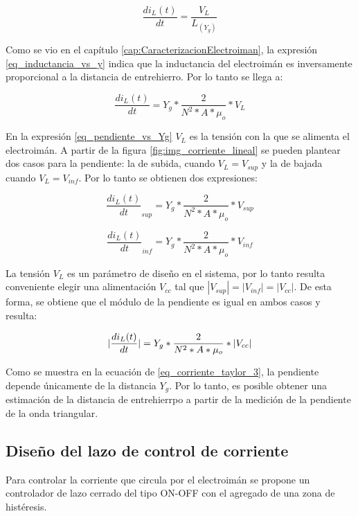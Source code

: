\begin{equation} 
	\frac{di_L(t)}{dt}= \frac{V_L}{L_{(Y_g)}}
\end{equation}


Como se vio en el capítulo \ref{cap:CaracterizacionElectroiman}, la expresión \ref{eq_inductancia_vs_y} indica que la inductancia del electroimán es inversamente proporcional a la distancia de entrehierro. Por lo tanto se llega a:

\begin{equation}\label{eq_pendiente_vs_Yg}
	\frac{di_L(t)}{dt}= Y_g*\frac{2}{N^2*A*\mu_o}*V_L
\end{equation}

En la expresión \ref{eq_pendiente_vs_Yg} $V_L$ es la tensión con la que se alimenta el electroimán. A partir de la figura \ref{fig:img_corriente_lineal} se pueden plantear dos casos para la pendiente: la de subida, cuando $V_L=V_{sup}$ y la de bajada cuando $V_L=V_{inf}$. Por lo tanto se obtienen dos expresiones:

\begin{equation} 
	\frac{di_L(t)}{dt}_{sup}= Y_g*\frac{2}{N^2*A*\mu_o}*V_{sup}
\end{equation}


\begin{equation}
	\frac{di_L(t)}{dt}_{inf}= Y_g*\frac{2}{N^2*A*\mu_o}*V_{inf}
\end{equation}

La tensión $V_L$ es un parámetro de diseño en el sistema, por lo tanto resulta conveniente elegir una alimentación $V_{cc}$ tal que $|V_{sup}|=|V_{inf}|=|V_{cc}|$. De esta forma, se obtiene que el módulo de la pendiente es igual en ambos casos y resulta:

\begin{equation} \label{eq_corriente_taylor_3}
	\lvert\frac{di_L(t)}{dt}\rvert= Y_g*\frac{2}{N^2*A*\mu_o}*\lvert V_{cc}\rvert
\end{equation}

Como se muestra en la ecuación de \ref{eq_corriente_taylor_3}, la pendiente depende únicamente de la distancia $Y_g$. Por lo tanto, es posible obtener una estimación de la distancia de entrehierrpo a partir de la medición de la pendiente de la onda triangular.

\subsection{Diseño del lazo de control de corriente}

Para controlar la corriente que circula por el electroimán se propone un controlador de lazo cerrado del tipo ON-OFF con el agregado de una zona de histéresis.

